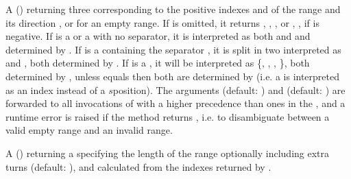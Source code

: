 \documentclass[letterpaper,10pt,english]{sphinxmanual}
\begin{document}
\begin{description}
\sphinxAtStartPar
A  (\sphinxcode{\sphinxupquote{{[}rng{]}, {[}ref{]}, {[}dir{]}}}) returning three  corresponding to the positive indexes  and  of the range and
its direction , or  for an empty range. If  is omitted, it returns , , , or , , 
if  is negative. If  is a  or a  with no \sphinxcode{\sphinxupquote{\textquotesingle{}/\textquotesingle{}}} separator, it is interpreted as both  and  and
determined by . If  is a  containing the separator \sphinxcode{\sphinxupquote{\textquotesingle{}/\textquotesingle{}}}, it is split in two  interpreted as 
and , both determined by . If  is a , it will be interpreted as \{, , \sphinxcode{\sphinxupquote{{[}ref{]}}}, \sphinxcode{\sphinxupquote{{[}dir{]}}}\},
both determined by , unless  equals  then both are determined by  (i.e. a  is interpreted as an
index instead of a \(s\)\sphinxhyphen{}position). The arguments  (default: ) and  (default: ) are forwarded to all invocations
of  with a higher precedence than ones in the  , and a runtime error is raised if the method returns , i.e.
to disambiguate between a valid empty range and an invalid range.

\sphinxAtStartPar
A  (\sphinxcode{\sphinxupquote{{[}rng{]}, {[}ntrn{]}, {[}dir{]}}}) returning a  specifying the length of the range optionally including  extra turns (default: ),
and calculated from the indexes returned by .


\end{description}
\end{document}
